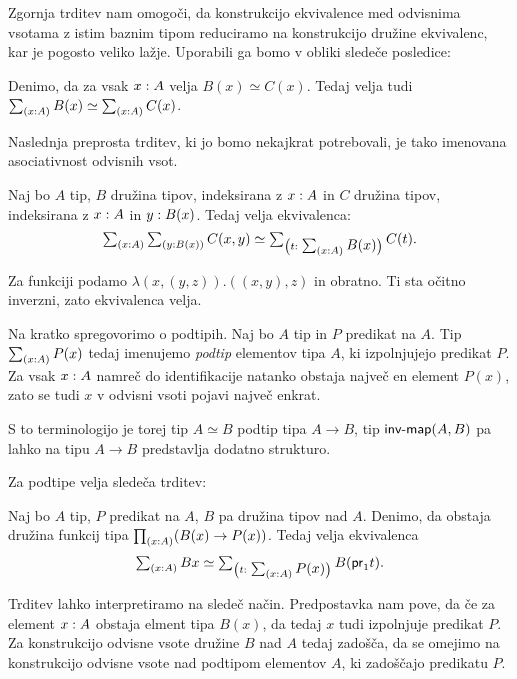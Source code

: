 Zgornja trditev nam omogoči, da konstrukcijo ekvivalence med odvisnima
vsotama z istim baznim tipom reduciramo na konstrukcijo družine ekvivalenc,
kar je pogosto veliko lažje. Uporabili ga bomo v obliki sledeče posledice:

\begin{posledica}
  \label{equiv-tot}
  Denimo, da za vsak \(x : A\) velja \(B(x) \simeq C(x)\). Tedaj velja tudi \(\textstyle \sum_{\left( x : A \right)} B(x) \simeq \textstyle \sum_{\left( x : A \right)} C(x)\).
\end{posledica}

Naslednja preprosta trditev, ki jo bomo nekajkrat potrebovali, je tako imenovana asociativnost odvisnih vsot.

\begin{trditev}
  \label{sigma-assoc}
  Naj bo \(A\) tip, \(B\) družina tipov, indeksirana z \(x : A\) in \(C\) družina tipov, indeksirana z \(x : A\) in \(y : B(x)\).
  Tedaj velja ekvivalenca:
  \[\textstyle \sum_{\left( x : A \right)} \textstyle \sum_{\left( y : B(x) \right)} C(x, y) \simeq
    \textstyle \sum_{\left( t : \textstyle \sum_{\left( x : A \right)} B(x) \right)} C(t).\]
\end{trditev}

\begin{dokaz}
  Za funkciji podamo \(\lambda (x, (y, z)).((x, y), z)\) in obratno. Ti sta očitno inverzni, zato ekvivalenca velja.
\end{dokaz}

Na kratko spregovorimo o podtipih. Naj bo \(A\) tip in \(P\) predikat na \(A\). Tip \(\textstyle \sum_{\left( x : A \right)} P(x)\) tedaj imenujemo \emph{podtip} elementov tipa \(A\), ki izpolnjujejo predikat \(P\).
Za vsak \(x : A\) namreč do identifikacije natanko obstaja največ en element \(P(x)\), zato se tudi \(x\) v odvisni vsoti pojavi največ enkrat.

S to terminologijo je torej tip \(A \simeq B\) podtip tipa \(A \to B\), tip \(\textnormal{\textsf{inv-map}}(A, B)\) pa lahko na tipu \(A \to B\) predstavlja dodatno strukturo.

Za podtipe velja sledeča trditev:

\begin{trditev}
  \label{full-subtype}
  Naj bo \(A\) tip, \(P\) predikat na \(A\), \(B\) pa družina tipov nad \(A\).
  Denimo, da obstaja družina funkcij tipa \(\textstyle \prod_{\left( x : A \right)} (B(x) \to P(x))\).
  Tedaj velja ekvivalenca
  \[\textstyle \sum_{\left( x : A \right)} Bx \simeq \textstyle \sum_{\left( t : \textstyle \sum_{\left( x : A \right)} P(x) \right)} B (\textnormal{\textsf{pr}}_{1} t).\]
\end{trditev}

Trditev lahko interpretiramo na sledeč način. Predpostavka nam pove, da če za element \(x : A\) obstaja elment tipa \(B(x)\), da tedaj \(x\) tudi izpolnjuje predikat \(P\). Za konstrukcijo odvisne vsote družine \(B\) nad \(A\) tedaj zadošča, da se omejimo na konstrukcijo odvisne vsote nad podtipom elementov \(A\), ki zadoščajo predikatu \(P\).

